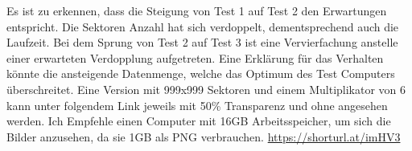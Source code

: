 Es ist zu erkennen, dass die Steigung von Test 1 auf Test 2 den Erwartungen entspricht. Die Sektoren  Anzahl hat sich verdoppelt, dementsprechend auch die Laufzeit. Bei dem Sprung von Test 2 auf Test 3 ist eine Vervierfachung anstelle einer erwarteten Verdopplung aufgetreten. Eine Erklärung für das Verhalten könnte die ansteigende Datenmenge, welche das Optimum des Test Computers überschreitet. Eine Version mit 999x999 Sektoren und einem Multiplikator von 6 kann unter folgendem Link jeweils mit 50\% Transparenz und ohne angesehen werden. Ich Empfehle einen Computer mit 16GB Arbeitsspeicher, um sich die Bilder anzusehen, da sie 1GB als PNG verbrauchen.
\newline
\url{https://shorturl.at/imHV3}